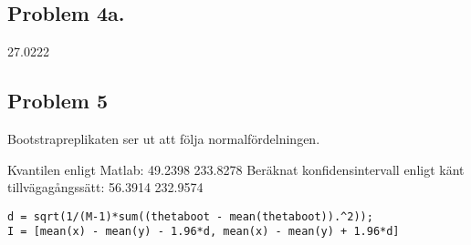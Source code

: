 \documentclass{article}
\begin{document}
\subsection*{Problem 4a.}
27.0222

\subsection*{Problem 5}

Bootstrapreplikaten ser ut att följa normalfördelningen.

Kvantilen enligt Matlab: 49.2398  233.8278
Beräknat konfidensintervall enligt känt tillvägagångssätt: 56.3914  232.9574

\begin{lstlisting}
d = sqrt(1/(M-1)*sum((thetaboot - mean(thetaboot)).^2));
I = [mean(x) - mean(y) - 1.96*d, mean(x) - mean(y) + 1.96*d]
\end{lstlisting}
\end{document}
